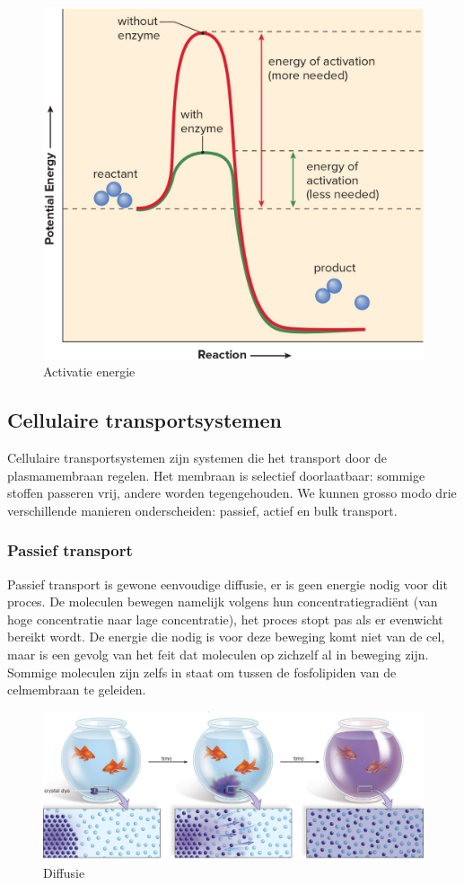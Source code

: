 \documentclass[a4paper,kul]{kulakarticle} %
\begin{document}
\begin{figure}[h]
	\centering
	\includegraphics[width=0.7\linewidth]{ActivatieEnergie}
	\caption[Activatie energie]{Activatie energie}
	\label{fig:activatieenergie}
\end{figure}



\subsection{Cellulaire transportsystemen}
Cellulaire transportsystemen zijn systemen die het transport door de plasmamembraan regelen. Het membraan is selectief doorlaatbaar: sommige stoffen passeren vrij, andere worden tegengehouden. We kunnen grosso modo drie verschillende manieren onderscheiden: passief, actief en bulk transport. 
\subsubsection{Passief transport}
Passief transport is gewone eenvoudige diffusie, er is geen energie nodig voor dit proces. De moleculen bewegen namelijk volgens hun concentratiegradiënt (van hoge concentratie naar lage concentratie), het proces stopt pas als er evenwicht bereikt wordt. De energie die nodig is voor deze beweging komt niet van de cel, maar is een gevolg van het feit dat moleculen op zichzelf al in beweging zijn. Sommige moleculen zijn zelfs in staat om tussen de fosfolipiden van de celmembraan te geleiden.
\begin{figure}[h]
	\centering
	\includegraphics[width=0.7\linewidth]{Diffusie}
	\caption[Diffusie]{Diffusie}
	\label{fig:diffusie}
\end{figure}
\end{document}
